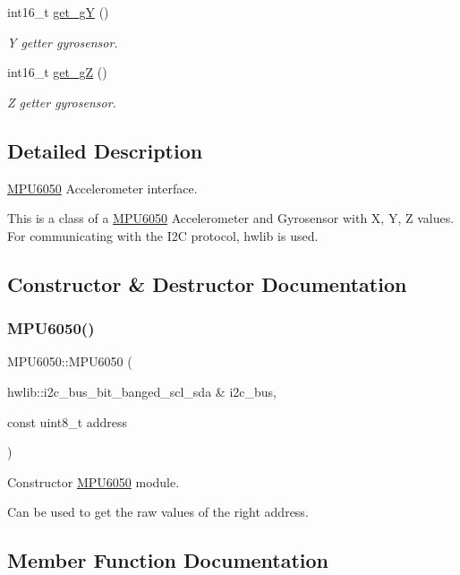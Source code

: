 \begin{DoxyCompactItemize}
int16\+\_\+t \hyperlink{classMPU6050_a3df5449f731caca323262c6dd8399909}{get\+\_\+gY} ()
\begin{DoxyCompactList}\small\item\em Y getter gyrosensor. \end{DoxyCompactList}\item 
int16\+\_\+t \hyperlink{classMPU6050_a0d408ead0e95bbb77427040d431cd30a}{get\+\_\+gZ} ()
\begin{DoxyCompactList}\small\item\em Z getter gyrosensor. \end{DoxyCompactList}\end{DoxyCompactItemize}


\subsection{Detailed Description}
\hyperlink{classMPU6050}{M\+P\+U6050} Accelerometer interface. 

This is a class of a \hyperlink{classMPU6050}{M\+P\+U6050} Accelerometer and Gyrosensor with X, Y, Z values. For communicating with the I2C protocol, hwlib is used. 

\subsection{Constructor \& Destructor Documentation}
\mbox{\label{classMPU6050_a7a445f8f9ae82bc06a6ab791d17f2cb3}} 
\subsubsection{\texorpdfstring{M\+P\+U6050()}{MPU6050()}}
{\footnotesize\ttfamily M\+P\+U6050\+::\+M\+P\+U6050 (\begin{DoxyParamCaption}\item[{hwlib\+::i2c\+\_\+bus\+\_\+bit\+\_\+banged\+\_\+scl\+\_\+sda \&}]{i2c\+\_\+bus,  }\item[{const uint8\+\_\+t}]{address }\end{DoxyParamCaption})}



Constructor \hyperlink{classMPU6050}{M\+P\+U6050} module. 

Can be used to get the raw values of the right address. 

\subsection{Member Function Documentation}
\mbox{\label{classMPU6050_a6d5b7dafd96fc69ef489bb00d0964e2d}} 
